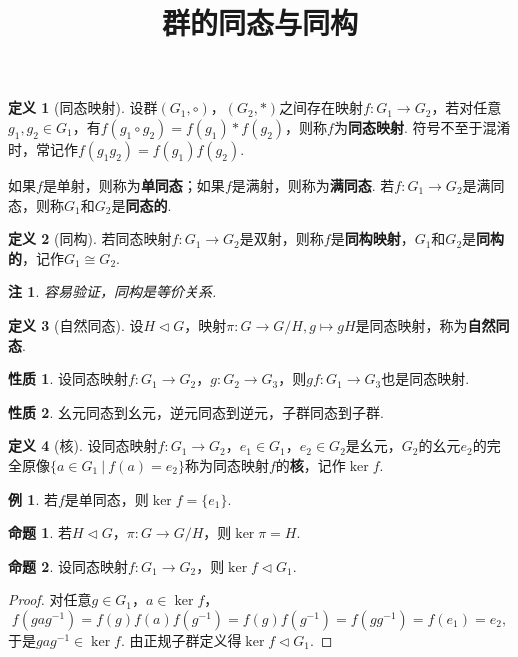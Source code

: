 \documentclass[12pt]{ctexart}
\title{\vspace{-2em}\textbf{群的同态与同构}\vspace{-2em}}
\date{ }
\theoremstyle{definition}
\newtheorem{definition}{定义}
\newtheorem{property}{性质}
\newtheorem{proposition}{命题}
\newtheorem{example}{例}
\theoremstyle{plain}
\newtheorem*{remark}{注}
\begin{document}
	\maketitle
	\begin{definition}[同态映射]
		设群$(G_1,\circ)$，$(G_2,\ast)$之间存在映射$f:G_1\to G_2$，若对任意$g_1,g_2\in G_1$，有$f(g_1\circ g_2)=f(g_1)\ast f(g_2)$，则称$f$为\textbf{同态映射}. 符号不至于混淆时，常记作$f(g_1g_2)=f(g_1)f(g_2)$.
	\end{definition}
	如果$f$是单射，则称为\textbf{单同态}；如果$f$是满射，则称为\textbf{满同态}. 若$f:G_1\to G_2$是满同态，则称$G_1$和$G_2$是\textbf{同态的}.
	\begin{definition}[同构]
		若同态映射$f:G_1\to G_2$是双射，则称$f$是\textbf{同构映射}，$G_1$和$G_2$是\textbf{同构的}，记作$G_1\cong G_2$.
	\end{definition}
	\begin{remark}
		容易验证，同构是等价关系.
	\end{remark}
	\begin{definition}[自然同态]
		设$H\lhd G$，映射$\pi:G\to G/H,g\mapsto gH$是同态映射，称为\textbf{自然同态}.
	\end{definition}
	\begin{property}
		设同态映射$f:G_1\to G_2$，$g:G_2\to G_3$，则$gf:G_1\to G_3$也是同态映射.
	\end{property}
	\begin{property}
		幺元同态到幺元，逆元同态到逆元，子群同态到子群.
	\end{property}
	\begin{definition}[核]
		设同态映射$f:G_1\to G_2$，$e_1\in G_1$，$e_2\in G_2$是幺元，$G_2$的幺元$e_2$的完全原像$\{a\in G_1\ |\ f(a)=e_2\}$称为同态映射$f$的\textbf{核}，记作$\ker f$.
	\end{definition}
	\begin{example}
		若$f$是单同态，则$\ker f=\{e_1\}$.
	\end{example}
	\begin{proposition}
		若$H\lhd G$，$\pi:G\to G/H$，则$\ker\pi=H$.
	\end{proposition}
	\begin{proposition}
		设同态映射$f:G_1\to G_2$，则$\ker f\lhd G_1$.
	\end{proposition}
	\begin{proof}
		对任意$g\in G_1$，$a\in\ker f$，
		$$f(gag^{-1})=f(g)f(a)f(g^{-1})=f(g)f(g^{-1})=f(gg^{-1})=f(e_1)=e_2,$$
		于是$gag^{-1}\in\ker f$. 由正规子群定义得$\ker f\lhd G_1$.
	\end{proof}
\end{document}
